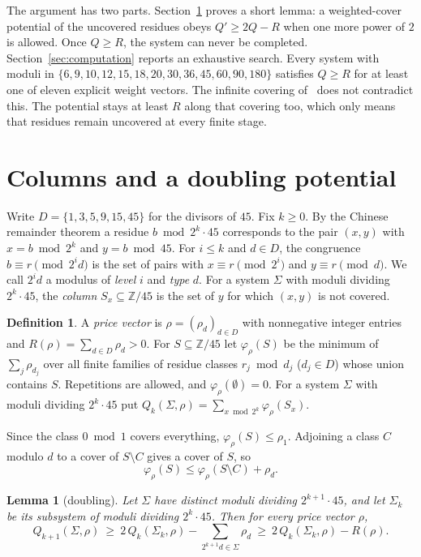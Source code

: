 \documentclass[11pt]{amsart}
\newtheorem{lemma}[theorem]{Lemma}
\theoremstyle{definition}
\newtheorem{definition}[theorem]{Definition}
\theoremstyle{remark}
\newcommand{\Z}{\mathbb Z}
\begin{document}
The argument has two parts. Section~\ref{sec:potential} proves a short lemma: a weighted-cover potential of the uncovered residues obeys $Q'\ge 2Q-R$ when one more power of $2$ is allowed. Once $Q\ge R$, the system can never be completed. Section~\ref{sec:computation} reports an exhaustive search. Every system with moduli in $\{6,9,10,12,15,18,20,30,36,45,60,90,180\}$ satisfies $Q\ge R$ for at least one of eleven explicit weight vectors. The infinite covering of~\cite[Theorem~1.10]{HKLT2026} does not contradict this. The potential stays at least $R$ along that covering too, which only means that residues remain uncovered at every finite stage.

\section{Columns and a doubling potential}\label{sec:potential}

Write $D=\{1,3,5,9,15,45\}$ for the divisors of $45$. Fix $k\ge0$. By the Chinese remainder theorem a residue $b \bmod 2^k\cdot45$ corresponds to the pair $(x,y)$ with $x=b\bmod 2^k$ and $y=b\bmod 45$. For $i\le k$ and $d\in D$, the congruence $b\equiv r\pmod{2^id}$ is the set of pairs with $x\equiv r\pmod{2^i}$ and $y\equiv r\pmod d$. We call $2^id$ a modulus of \emph{level} $i$ and \emph{type} $d$. For a system $\Sigma$ with moduli dividing $2^k\cdot45$, the \emph{column} $S_x\subseteq\Z/45$ is the set of $y$ for which $(x,y)$ is not covered.

\begin{definition}
A \emph{price vector} is $\rho=(\rho_d)_{d\in D}$ with nonnegative integer entries and $R(\rho)=\sum_{d\in D}\rho_d>0$. For $S\subseteq \Z/45$ let $\varphi_\rho(S)$ be the minimum of $\sum_j\rho_{d_j}$ over all finite families of residue classes $r_j\bmod d_j$ ($d_j\in D$) whose union contains $S$. Repetitions are allowed, and $\varphi_\rho(\emptyset)=0$. For a system $\Sigma$ with moduli dividing $2^k\cdot45$ put $Q_k(\Sigma,\rho)=\sum_{x\bmod 2^k}\varphi_\rho(S_x)$.
\end{definition}

Since the class $0\bmod1$ covers everything, $\varphi_\rho(S)\le\rho_1$. Adjoining a class $C$ modulo $d$ to a cover of $S\setminus C$ gives a cover of $S$, so
\begin{equation}\label{eq:sub}
 \varphi_\rho(S)\le \varphi_\rho(S\setminus C)+\rho_d .
\end{equation}

\begin{lemma}[doubling]\label{lem:doubling}
Let $\Sigma$ have distinct moduli dividing $2^{k+1}\cdot 45$, and let $\Sigma_k$ be its subsystem of moduli dividing $2^k\cdot45$. Then for every price vector $\rho$,
\[ Q_{k+1}(\Sigma,\rho)\ \ge\ 2\,Q_k(\Sigma_k,\rho)-\sum_{2^{k+1}d\in\Sigma}\rho_d\ \ge\ 2\,Q_k(\Sigma_k,\rho)-R(\rho). \]
\end{lemma}
\end{document}
